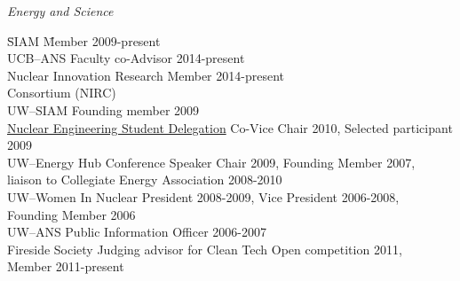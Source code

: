 \textit{Energy and Science}
\begin{tabbing}
\hspace*{2 em}\= SIAM  \hspace*{15em} \= Member 2009-present\\
%
\> UCB--ANS \> Faculty co-Advisor 2014-present  \\
%
\> Nuclear Innovation Research \> Member 2014-present\\
\> \hspace*{2 em} Consortium (NIRC) \\
%
\> UW--SIAM \> Founding member 2009\\
%
\> \href{http://www.nesd.org/}{Nuclear Engineering Student Delegation} \> Co-Vice Chair 2010, Selected participant 2009\\
%
\> UW--Energy Hub \> Conference Speaker Chair 2009, Founding Member 2007,  \\ \> \> liaison to Collegiate Energy Association 2008-2010\\
%
\> UW--Women In Nuclear \> President 2008-2009, Vice President 2006-2008,  \\ \> \> Founding Member 2006\\
%
\> UW--ANS \> Public Information Officer 2006-2007 \\
%
\> Fireside Society \> Judging advisor for Clean Tech Open competition 2011,  \\ \> \>Member 2011-present
\end{tabbing}

